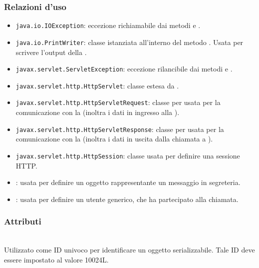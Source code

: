 \subsubsection*{Relazioni d'uso}
\begin{itemize}
	\item \texttt{java.io.IOException}: eccezione richiamabile dai metodi  e .
	\item \texttt{java.io.PrintWriter}: classe istanziata all'interno del metodo . Usata per scrivere l'output della .
	\item \texttt{javax.servlet.ServletException}: eccezione rilancibile dai metodi  e .
	\item \texttt{javax.servlet.http.HttpServlet}: classe estesa da .
	\item \texttt{javax.servlet.http.HttpServletRequest}:  classe per usata per la comunicazione con la  (inoltra i dati in ingresso alla ).
	\item \texttt{javax.servlet.http.HttpServletResponse}: classe per usata per la comunicazione con la  (inoltra i dati in uscita dalla chiamata a ).
	\item \texttt{javax.servlet.http.HttpSession}: classe usata per definire una sessione HTTP.
	\item {}: usata per definire un oggetto rappresentante un messaggio in segreteria.
	\item {}: usata per definire un utente generico, che ha partecipato alla chiamata.
\end{itemize}

\subsubsection*{Attributi}
\begin{description}
  \item{}\\
  Utilizzato come ID univoco per identificare un oggetto serializzabile. Tale ID deve essere impostato al valore 10024L.
\end{description}

